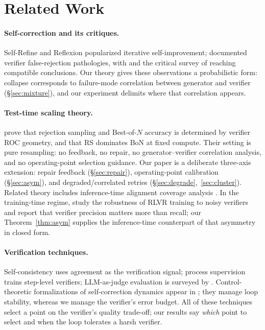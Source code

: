 \documentclass[10pt]{article}
\begin{document}
\section{Related Work}\label{sec:related}

\paragraph{Self-correction and its critiques.}
Self-Refine \citep{madaan2023selfrefine} and Reflexion
\citep{shinn2023reflexion} popularized iterative self-improvement;
\citet{stechly2024selfverify} documented verifier false-rejection
pathologies, with \citet{huang2024cannot} and the critical survey
of \citet{kamoi2024when} reaching compatible conclusions.  Our
theory gives these observations a probabilistic form: collapse
corresponds to failure-mode correlation between generator and
verifier (§\ref{sec:mixture}), and our experiment delimits where
that correlation appears.

\paragraph{Test-time scaling theory.}
\citet{dorner2026rocnreroll} prove that rejection sampling and
Best-of-$N$ accuracy is determined by verifier ROC geometry, and
that RS dominates BoN at fixed compute.  Their setting is pure
resampling: no feedback, no repair, no generator--verifier
correlation analysis, and no operating-point selection guidance.
Our paper is a deliberate three-axis extension: repair feedback
(§\ref{sec:repair}), operating-point calibration
(§\ref{sec:asym}), and degraded/correlated retries
(§\ref{sec:degrade},~\ref{sec:cluster}).  Related theory includes
inference-time alignment coverage analysis
\citep{huang2025bestofn}.  In the training-time regime,
\citet{plesner2026imperfect} study the robustness of RLVR training
to noisy verifiers and report that verifier precision matters more
than recall; our Theorem~\ref{thm:asym} supplies the inference-time
counterpart of that asymmetry in closed form.

\paragraph{Verification techniques.}
Self-consistency \citep{wang2023selfconsistency} uses agreement as
the verification signal; process supervision
\citep{lightman2024verify} trains step-level verifiers;
LLM-as-judge evaluation is surveyed by \citet{zheng2023judging}.
Control-theoretic formalizations of self-correction dynamics appear
in \citet{wu2026cybercorrect}; they manage loop stability, whereas
we manage the verifier's error budget.  All of these techniques
select a point on the verifier's quality trade-off; our results say
\emph{which} point to select and when the loop tolerates a harsh
verifier.
\end{document}

